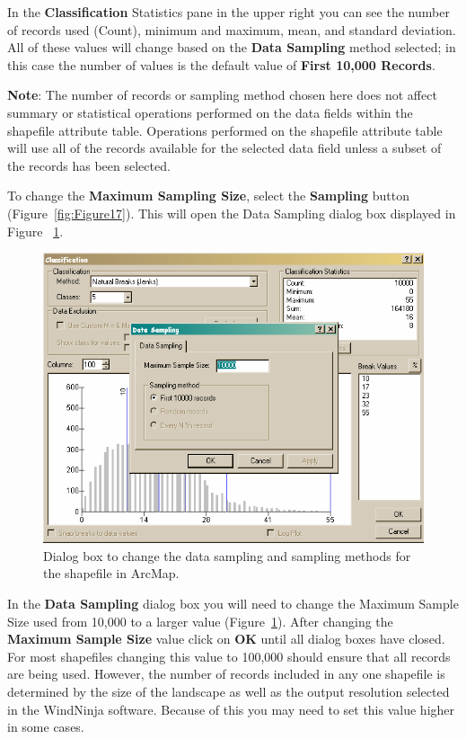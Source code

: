 \documentclass[12pt]{article}
\begin{document}
In the \textbf{Classification} Statistics pane in the upper right you can see the number of records used (Count), minimum
and maximum, mean, and standard deviation. All of these values will change based on the \textbf{Data Sampling} method
selected; in this case the number of values is the default value of \textbf{First 10,000 Records}.

\textbf{Note}: The number of records or sampling method chosen here does not affect summary or statistical operations performed on the data fields within the shapefile attribute table. Operations performed on the shapefile attribute table will use all of the records available for the selected data field unless a subset of the records has been selected.

To change the \textbf{Maximum Sampling Size}, select the \textbf{Sampling} button (Figure~\ref{fig:Figure17}). This will open the Data Sampling dialog box displayed in Figure ~\ref{fig:Figure18}.

\begin{figure}[H]
	\centering
	\includegraphics[scale=0.7]{arc_18.png}
	\caption{Dialog box to change the data sampling and sampling methods for the shapefile in ArcMap.}
\label{fig:Figure18}
\end{figure}

In the \textbf{Data Sampling} dialog box you will need to change the Maximum Sample Size used from 10,000 to a larger value (Figure~\ref{fig:Figure18}). After changing the \textbf{Maximum Sample Size} value click on \textbf{OK} until all dialog boxes have closed. For most shapefiles changing this value to 100,000 should ensure that all records are being used. However, the number of records included in any one shapefile is determined by the size of the landscape as well as the output resolution selected in the WindNinja software. Because of this you may need to set this value higher in some cases.
\end{document}
